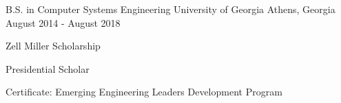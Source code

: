 \begin{cventries}
  \cventry
    {B.S. in Computer Systems Engineering}
    {University of Georgia}
    {Athens, Georgia}
    {August 2014 - August 2018}
    {
      \begin{cvitems}
        \item {Zell Miller Scholarship}
        \item {Presidential Scholar}
        \item {Certificate: Emerging Engineering Leaders Development Program}
      \end{cvitems}
    }
\end{cventries}
